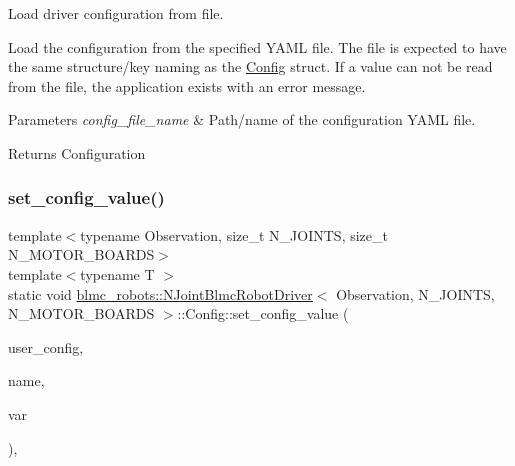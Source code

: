 Load driver configuration from file. 

Load the configuration from the specified Y\+A\+ML file. The file is expected to have the same structure/key naming as the \hyperlink{structblmc__robots_1_1NJointBlmcRobotDriver_1_1Config}{Config} struct. If a value can not be read from the file, the application exists with an error message.


\begin{DoxyParams}{Parameters}
{\em config\+\_\+file\+\_\+name} & Path/name of the configuration Y\+A\+ML file.\\
\hline
\end{DoxyParams}
\begin{DoxyReturn}{Returns}
Configuration 
\end{DoxyReturn}
\mbox{\label{structblmc__robots_1_1NJointBlmcRobotDriver_1_1Config_acf6b753c2a2cbf8cedc97da4a5a0f83c}} 
\subsubsection{\texorpdfstring{set\+\_\+config\+\_\+value()}{set\_config\_value()}}
{\footnotesize\ttfamily template$<$typename Observation, size\+\_\+t N\+\_\+\+J\+O\+I\+N\+TS, size\+\_\+t N\+\_\+\+M\+O\+T\+O\+R\+\_\+\+B\+O\+A\+R\+DS$>$ \\
template$<$typename T $>$ \\
static void \hyperlink{classblmc__robots_1_1NJointBlmcRobotDriver}{blmc\+\_\+robots\+::\+N\+Joint\+Blmc\+Robot\+Driver}$<$ Observation, N\+\_\+\+J\+O\+I\+N\+TS, N\+\_\+\+M\+O\+T\+O\+R\+\_\+\+B\+O\+A\+R\+DS $>$\+::Config\+::set\+\_\+config\+\_\+value (\begin{DoxyParamCaption}\item[{const Y\+A\+M\+L\+::\+Node \&}]{user\+\_\+config,  }\item[{const std\+::string \&}]{name,  }\item[{T $\ast$}]{var }\end{DoxyParamCaption})\hspace{0.3cm}{\ttfamily [static]}, {\ttfamily [private]}}



